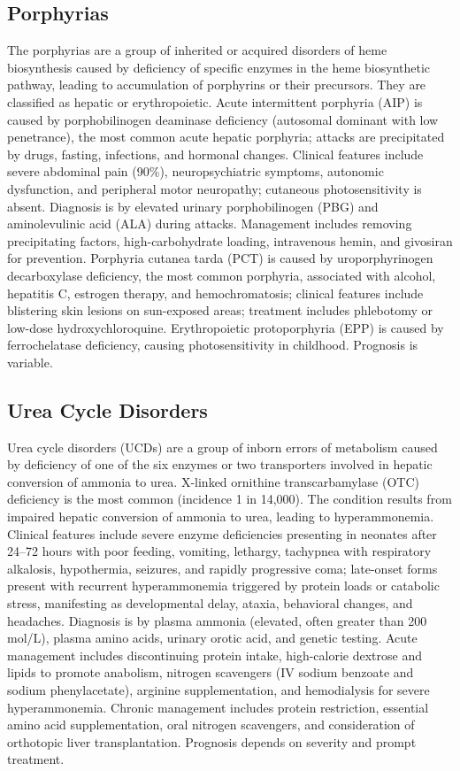 \subsection{Porphyrias}
\label{sec:Porphyrias}
The porphyrias are a group of inherited or acquired disorders of heme biosynthesis caused by deficiency of specific enzymes in the heme biosynthetic pathway, leading to accumulation of porphyrins or their precursors. They are classified as hepatic or erythropoietic. Acute intermittent porphyria (AIP) is caused by porphobilinogen deaminase deficiency (autosomal dominant with low penetrance), the most common acute hepatic porphyria; attacks are precipitated by drugs, fasting, infections, and hormonal changes. Clinical features include severe abdominal pain (90\%), neuropsychiatric symptoms, autonomic dysfunction, and peripheral motor neuropathy; cutaneous photosensitivity is absent. Diagnosis is by elevated urinary porphobilinogen (PBG) and aminolevulinic acid (ALA) during attacks. Management includes removing precipitating factors, high-carbohydrate loading, intravenous hemin, and givosiran for prevention. Porphyria cutanea tarda (PCT) is caused by uroporphyrinogen decarboxylase deficiency, the most common porphyria, associated with alcohol, hepatitis C, estrogen therapy, and hemochromatosis; clinical features include blistering skin lesions on sun-exposed areas; treatment includes phlebotomy or low-dose hydroxychloroquine. Erythropoietic protoporphyria (EPP) is caused by ferrochelatase deficiency, causing photosensitivity in childhood. Prognosis is variable.

\subsection{Urea Cycle Disorders}
\label{sec:Urea Cycle Disorders}
Urea cycle disorders (UCDs) are a group of inborn errors of metabolism caused by deficiency of one of the six enzymes or two transporters involved in hepatic conversion of ammonia to urea. X-linked ornithine transcarbamylase (OTC) deficiency is the most common (incidence 1 in 14,000). The condition results from impaired hepatic conversion of ammonia to urea, leading to hyperammonemia. Clinical features include severe enzyme deficiencies presenting in neonates after 24--72 hours with poor feeding, vomiting, lethargy, tachypnea with respiratory alkalosis, hypothermia, seizures, and rapidly progressive coma; late-onset forms present with recurrent hyperammonemia triggered by protein loads or catabolic stress, manifesting as developmental delay, ataxia, behavioral changes, and headaches. Diagnosis is by plasma ammonia (elevated, often greater than 200 \textmu mol/L), plasma amino acids, urinary orotic acid, and genetic testing. Acute management includes discontinuing protein intake, high-calorie dextrose and lipids to promote anabolism, nitrogen scavengers (IV sodium benzoate and sodium phenylacetate), arginine supplementation, and hemodialysis for severe hyperammonemia. Chronic management includes protein restriction, essential amino acid supplementation, oral nitrogen scavengers, and consideration of orthotopic liver transplantation. Prognosis depends on severity and prompt treatment.

